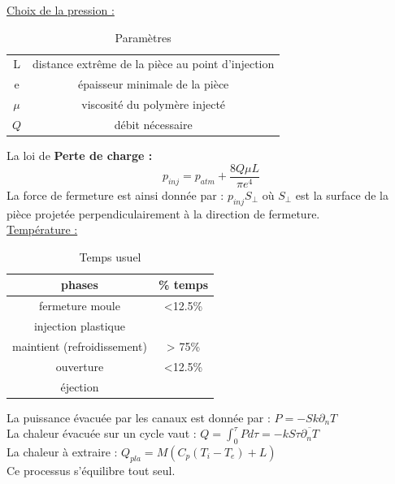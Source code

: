 \documentclass[../main.tex]{subfiles}
\begin{document}
\quad \underline{Choix de la pression :} \begin{table}[hbt!]
    \centering
    \begin{tabular}{c|c}
        L & distance extrême de la pièce au point d'injection \\
        e & épaisseur minimale de la pièce\\
        $\mu$ & viscosité du polymère injecté\\
        $Q$ & débit nécessaire\\
    \end{tabular}
    \caption{Paramètres}
\end{table}
La loi de \textbf{Perte de charge :}\begin{equation}
    p_{inj} = p_{atm} + \frac{8 Q \mu L}{\pi e^4}
\end{equation}
La force de fermeture est ainsi donnée par : $p_{inj} S_\perp$ où $S_\perp$ est la surface de la pièce projetée perpendiculairement à la direction de fermeture.\\

\quad \underline{Température :}\\
\begin{table}[hbt!]
    \centering
    \begin{tabular}{c|c}
        phases & \% temps \\
        \hline
        fermeture moule & <12.5\%\\
        injection plastique & \\
        \hline
        maintient (refroidissement) & > 75\%\\
        \hline
        ouverture & <12.5\%\\
        éjection & \\
    \end{tabular}
    \caption{Temps usuel}
\end{table}

La puissance évacuée par les canaux est donnée par : $P = -S k \partial_n T$\\
La chaleur évacuée sur un cycle vaut : $Q = \int_0^\tau P d\tau = -kS \tau \overline{\partial_n T}$\\
La chaleur à extraire : $Q_{pla} = M(C_p(T_i-T_e)+L)$\\

Ce processus s'équilibre tout seul. \\
\end{document}
